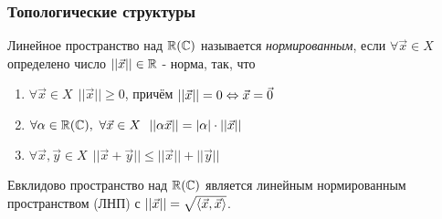 \subsubsection*{Топологические структуры}

\begin{definition}
	Линейное пространство над $\mathbb{R}(\mathbb{C})$ называется \textit{нормированным}, если $\forall \vec{x} \in X$ определено число $||\vec{x}|| \in \mathbb{R}$ - норма, так, что
	\begin{enumerate}
		\item $\forall \vec{x} \in X\ \ ||\vec{x}|| \ge 0$, причём $||\vec{x}|| = 0 \Leftrightarrow \vec{x} = \vec{0}$
		
		\item $\forall \alpha \in \mathbb{R}(\mathbb{C}),\ \forall \vec{x} \in X\ \ ||\alpha \vec{x}|| = |\alpha| \cdot ||\vec{x}||$
		
		\item $\forall \vec{x}, \vec{y} \in X\ \ ||\vec{x} + \vec{y}|| \le ||\vec{x}|| + ||\vec{y}||$
	\end{enumerate}
\end{definition}

\begin{theorem} 
	Евклидово пространство над $\mathbb{R}(\mathbb{C})$ является линейным нормированным пространством (ЛНП) с $||\vec{x}|| = \sqrt{\langle\vec{x}, \vec{x}\rangle}$.
\end{theorem}

